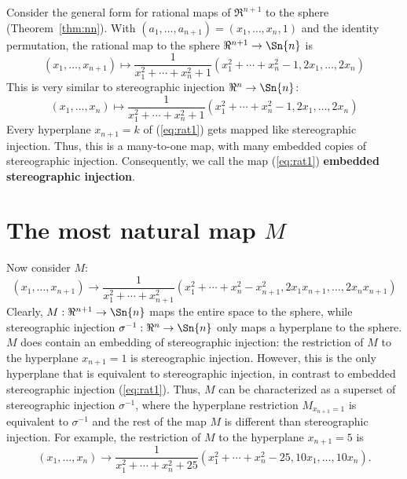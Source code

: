 Consider the general form for rational maps of $\Re^{n+1}$ to the sphere
(Theorem~\ref{thm:nn}).
With $(a_1,\ldots,a_{n+1}) = (x_1,\ldots,x_{n},1)$ and the identity permutation,
the rational map to the sphere $\Re^{n+1} \rightarrow \Sn{n}$ is
\begin{equation}
\label{eq:rat1}
(x_1,\ldots,x_{n+1}) \mapsto 
	\frac{1}{x_1^2 + \cdots + x_{n}^2 + 1}
	(x_1^2 + \cdots + x_{n}^2 - 1,
	 2x_1, \ldots, 2x_{n})
\end{equation}
This is very similar to stereographic injection 
$\Re^n \rightarrow \Sn{n}$:
\begin{equation}
\label{eq:si}
(x_1,\ldots,x_n) \mapsto
	\frac{1}{x_1^2 + \cdots + x_n^2 + 1} 
	(x_1^2 + \cdots + x_n^2 - 1, 2x_1, \ldots, 2x_n)
\end{equation}
Every hyperplane $x_{n+1}=k$ of (\ref{eq:rat1}) gets mapped like stereographic injection.
Thus, this is a many-to-one map, with many embedded copies of stereographic injection.
Consequently, we call the map (\ref{eq:rat1}) 
{\bf embedded stereographic injection}.

\section{The most natural map $M$}
\label{sec:M}

Now consider $M$:
\begin{equation}
\label{eq:M}
	(x_{1},\ldots,x_{n+1}) \rightarrow
	\frac{1}{x_1^2 + \cdots + x_{n+1}^2}
	(x_1^2 + \cdots + x_{n}^2 - x_{n+1}^2,
	 2x_1x_{n+1}, \ldots, 2x_{n}x_{n+1})
\end{equation}
%
Clearly, $M: \Re^{n+1} \rightarrow \Sn{n}$ maps the entire space to the sphere,
while stereographic injection $\sigma^{-1}:\Re^n \rightarrow \Sn{n}$ only maps
a hyperplane to the sphere.
$M$ does contain an embedding of stereographic injection:
the restriction of $M$ to the hyperplane $x_{n+1}=1$
is stereographic injection.
However, this is the only hyperplane that is equivalent
to stereographic injection, in contrast to embedded stereographic injection
(\ref{eq:rat1}).
Thus, $M$ can be characterized as a superset of stereographic injection 
$\sigma^{-1}$,
where the hyperplane restriction $M_{x_{n+1}=1}$ is equivalent to $\sigma^{-1}$
and the rest of the map $M$ is different than stereographic injection.
For example, the restriction of $M$ to the hyperplane $x_{n+1}=5$ is
\[
	(x_{1},\ldots,x_n) \rightarrow
	\frac{1}{x_1^2 + \cdots + x_n^2 + 25}
	(x_1^2 + \cdots + x_{n}^2 - 25, 10x_1, \ldots, 10x_n).
\]


